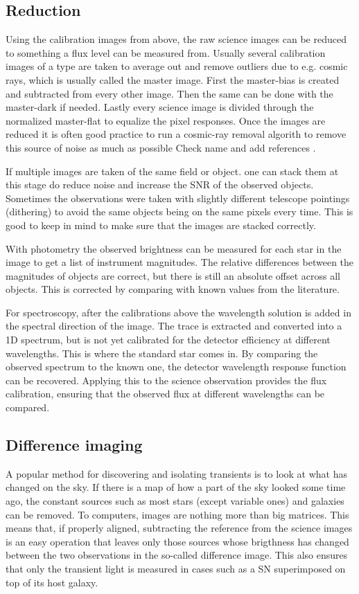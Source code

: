 \documentclass[a4paper,oneside,12pt, class=Latex/Classes/PhDthesisPSnPDF, crop=false]{standalone}
\begin{document}
\subsection{Reduction}
Using the calibration images from above, the raw science images can be reduced to something a flux level can be measured from. Usually several calibration images of a type are taken to average out and remove outliers due to e.g. cosmic rays, which is usually called the master image. First the master-bias is created and subtracted from every other image. Then the same can be done with the master-dark if needed. Lastly every science image is divided through the normalized master-flat to equalize the pixel responses. Once the images are reduced it is often good practice to run a cosmic-ray removal algorith to remove this source of noise as much as possible \color{red} Check name and add references \color{black}.

If multiple images are taken of the same field or object. one can stack them at this stage do reduce noise and increase the SNR of the observed objects. Sometimes the observations were taken with slightly different telescope pointings (dithering) to avoid the same objects being on the same pixels every time. This is good to keep in mind to make sure that the images are stacked correctly.

With photometry the observed brightness can be measured for each star in the image to get a list of instrument magnitudes. The relative differences between the magnitudes of objects are correct, but there is still an absolute offset across all objects. This is corrected by comparing with known values from the literature.

For spectroscopy, after the calibrations above the wavelength solution is added in the spectral direction of the image. The trace is extracted and converted into a 1D spectrum, but is not yet calibrated for the detector efficiency at different wavelengths. This is where the standard star comes in. By comparing the observed spectrum to the known one, the detector wavelength response function can be recovered. Applying this to the science observation provides the flux calibration, ensuring that the observed flux at different wavelengths can be compared.

\subsection{Difference imaging}
A popular method for discovering and isolating transients is to look at what has changed on the sky. If there is a map of how a part of the sky looked some time ago, the constant sources such as most stars (except variable ones) and galaxies can be removed. To computers, images are nothing more than big matrices. This means that, if properly aligned, subtracting the reference from the science images is an easy operation that leaves only those sources whose brigthness has changed between the two observations in the so-called difference image. This also ensures that only the transient light is measured in cases such as a SN superimposed on top of its host galaxy.
\end{document}
